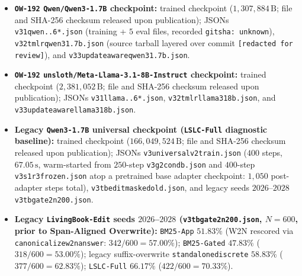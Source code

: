 \documentclass[11pt]{article}
\renewcommand{\_}{\origunderscore\allowbreak}
\begin{document}
\begin{itemize}
    \item \textbf{\texttt{OW-192} \texttt{Qwen/Qwen3-1.7B} checkpoint:} trained checkpoint ($1{,}307{,}884\,\text{B}$; file and SHA-256 checksum released upon publication); JSONs \texttt{v31\_qwen\_1..6*.json} (training + $5$ eval files, recorded \texttt{git\_sha: unknown}), \texttt{v32\_tmlr\_qwen3\_1.7b.json} (source tarball layered over commit \texttt{[redacted for review]}), and \texttt{v33\_update\_aware\_qwen3\_1.7b.json}.
    \item \textbf{\texttt{OW-192} \texttt{unsloth/\allowbreak Meta-Llama-3.1-8B-Instruct} checkpoint:} trained checkpoint ($2{,}381{,}052\,\text{B}$; file and SHA-256 checksum released upon publication); JSONs \texttt{v31\_llama\_1..6*.json}, \texttt{v32\_tmlr\_llama31\_8b.json}, and \texttt{v33\_update\_aware\_llama31\_8b.json}.
    \item \textbf{Legacy \texttt{Qwen3-1.7B} universal checkpoint (\texttt{LSLC-Full} diagnostic baseline):} trained checkpoint ($166{,}049{,}524\,\text{B}$; file and SHA-256 checksum released upon publication); JSONs \texttt{v3\_universal\_\allowbreak v2\_train.json} ($400$ steps, $67.05\,\text{s}$, warm-started from $250$-step \texttt{v3\_g2\_cond\_b.json} and $400$-step \texttt{v3\_s1\_r3\_frozen.json} atop a pretrained base adapter checkpoint: $1{,}050$ post-adapter steps total), \texttt{v3\_tb\_1\_edit\_masked\_old.json}, and legacy seeds $2026$--$2028$ \texttt{v3\_tb\_3\_gate2\_n200.json}.
    \item \textbf{Legacy \texttt{LivingBook-Edit} seeds $2026$--$2028$ (\texttt{v3\_tb\_3\_gate2\_n200.json}, $N=600$, prior to Span-Aligned Overwrite):} \texttt{BM25-App} $51.83\%$ (W2N rescored via \texttt{canonicalize\_w2n\_answer}: $342/600 = 57.00\%$); \texttt{BM25-Gated} $47.83\%$ ($318/600 = 53.00\%$); legacy suffix-overwrite \texttt{standalone\_discrete} $58.83\%$ ($377/600 = 62.83\%$); \texttt{LSLC-Full} $66.17\%$ ($422/600 = 70.33\%$).
\end{itemize}

\clearpage
\end{document}
